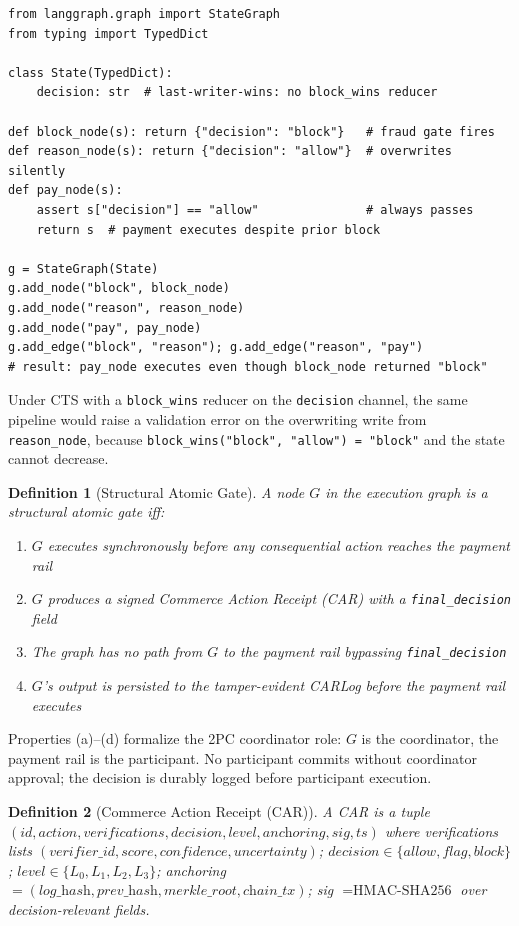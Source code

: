 \documentclass{article}
\newtheorem{definition}{Definition}
\begin{document}
\begin{lstlisting}
from langgraph.graph import StateGraph
from typing import TypedDict

class State(TypedDict):
    decision: str  # last-writer-wins: no block_wins reducer

def block_node(s): return {"decision": "block"}   # fraud gate fires
def reason_node(s): return {"decision": "allow"}  # overwrites silently
def pay_node(s):
    assert s["decision"] == "allow"               # always passes
    return s  # payment executes despite prior block

g = StateGraph(State)
g.add_node("block", block_node)
g.add_node("reason", reason_node)
g.add_node("pay", pay_node)
g.add_edge("block", "reason"); g.add_edge("reason", "pay")
# result: pay_node executes even though block_node returned "block"
\end{lstlisting}

Under CTS with a \texttt{block\_wins} reducer on the \texttt{decision} channel, the same pipeline would raise a validation error on the overwriting write from \texttt{reason\_node}, because \texttt{block\_wins("block", "allow") = "block"} and the state cannot decrease.

\begin{definition}[Structural Atomic Gate]
A node $G$ in the execution graph is a \emph{structural atomic gate} iff:
\begin{enumerate}
\item[(a)] $G$ executes synchronously before any consequential action reaches the payment rail
\item[(b)] $G$ produces a signed Commerce Action Receipt (CAR) with a \texttt{final\_decision} field
\item[(c)] The graph has no path from $G$ to the payment rail bypassing \texttt{final\_decision}
\item[(d)] $G$'s output is persisted to the tamper-evident CARLog before the payment rail executes
\end{enumerate}
\end{definition}

Properties (a)--(d) formalize the 2PC coordinator role: $G$ is the coordinator, the payment rail is the participant. No participant commits without coordinator approval; the decision is durably logged before participant execution.

\begin{definition}[Commerce Action Receipt (CAR)]
A CAR is a tuple $(\textit{id}, \textit{action}, \textit{verifications}, \textit{decision}, \textit{level}, \textit{anchoring}, \textit{sig}, \textit{ts})$ where \textit{verifications} lists $(\textit{verifier\_id}, \textit{score}, \textit{confidence}, \textit{uncertainty})$; $\textit{decision} \in \{\textit{allow}, \textit{flag}, \textit{block}\}$; $\textit{level} \in \{L_0, L_1, L_2, L_3\}$; \textit{anchoring} $= (\textit{log\_hash}, \textit{prev\_hash}, \textit{merkle\_root}, \textit{chain\_tx})$; \textit{sig} $= \text{HMAC-SHA256}$ over decision-relevant fields.
\end{definition}
\end{document}
